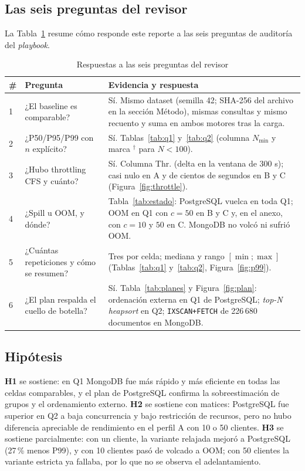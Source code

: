 \documentclass[12pt,letterpaper]{article}
\newenvironment{apatab}[1][!htbp]{\begin{table}[#1]\singlespacing}{\end{table}}
\newcommand{\code}[1]{\texttt{#1}}
\newcommand{\Mongo}{MongoDB}
\newcommand{\PG}{PostgreSQL}
\begin{document}
\subsection{Las seis preguntas del revisor}
La Tabla~\ref{tab:revisor} resume cómo responde este reporte a las seis preguntas de auditoría del \textit{playbook}.
\begin{apatab}
\caption{Respuestas a las seis preguntas del revisor}\label{tab:revisor}
\small
\begin{tabular}{@{}p{0.3in}p{2.1in}p{3.65in}@{}}
\toprule
\# & Pregunta & Evidencia y respuesta \\
\midrule
1 & ¿El baseline es comparable? & Sí. Mismo dataset (semilla 42; SHA-256 del archivo en la sección Método), mismas consultas y mismo recuento y suma en ambos motores tras la carga. \\
2 & ¿P50/P95/P99 con $n$ explícito? & Sí. Tablas~\ref{tab:q1} y~\ref{tab:q2} (columna $N_{\min}$ y marca $^{\dagger}$ para $N<100$). \\
3 & ¿Hubo throttling CFS y cuánto? & Sí. Columna Thr. (delta en la ventana de 300 s); casi nulo en A y de cientos de segundos en B y C (Figura~\ref{fig:throttle}). \\
4 & ¿Spill u OOM, y dónde? & Tabla~\ref{tab:estado}: \PG{} vuelca en toda Q1; OOM en Q1 con $c=50$ en B y C y, en el anexo, con $c=10$ y $50$ en C. \Mongo{} no volcó ni sufrió OOM. \\
5 & ¿Cuántas repeticiones y cómo se resumen? & Tres por celda; mediana y rango $[\min;\max]$ (Tablas~\ref{tab:q1} y~\ref{tab:q2}, Figura~\ref{fig:p99}). \\
6 & ¿El plan respalda el cuello de botella? & Sí. Tabla~\ref{tab:planes} y Figura~\ref{fig:plan}: ordenación externa en Q1 de \PG{}; \textit{top-N heapsort} en Q2; \code{IXSCAN+FETCH} de 226\,680 documentos en \Mongo{}. \\
\bottomrule
\end{tabular}
\end{apatab}

\subsection{Hipótesis}
\textbf{H1} se sostiene: en Q1 \Mongo{} fue más rápido y más eficiente en todas las celdas comparables, y el plan de \PG{} confirma la sobreestimación de grupos y el ordenamiento externo. \textbf{H2} se sostiene con matices: \PG{} fue superior en Q2 a baja concurrencia y bajo restricción de recursos,
pero no hubo diferencia apreciable de rendimiento en el perfil A con 10 o 50 clientes. \textbf{H3} se sostiene parcialmente: con un cliente, la variante relajada mejoró a \PG{} (27\,\% menos P99), y con 10 clientes pasó de volcado a OOM; con 50 clientes la variante estricta ya fallaba, por lo que
no se observa el adelantamiento.
\end{document}
